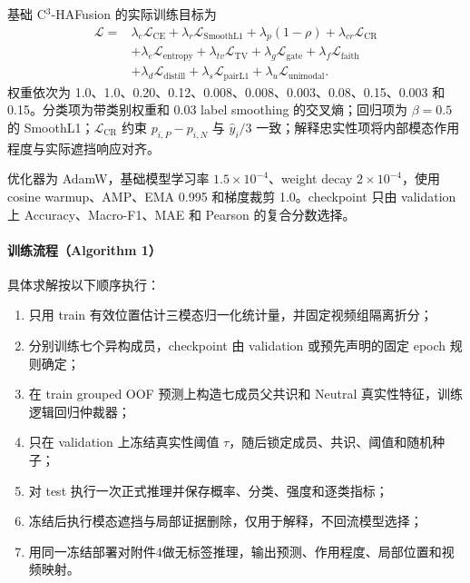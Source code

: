 基础 C$^3$-HAFusion 的实际训练目标为
\begin{equation}
\begin{aligned}
\mathcal L={}&\lambda_c\mathcal L_{\mathrm{CE}}+
\lambda_r\mathcal L_{\mathrm{SmoothL1}}+
\lambda_p(1-\rho)+\lambda_{cr}\mathcal L_{\mathrm{CR}}\\
&+\lambda_e\mathcal L_{\mathrm{entropy}}+
\lambda_{tv}\mathcal L_{\mathrm{TV}}+
\lambda_g\mathcal L_{\mathrm{gate}}+
\lambda_f\mathcal L_{\mathrm{faith}}\\
&+\lambda_d\mathcal L_{\mathrm{distill}}+
\lambda_s\mathcal L_{\mathrm{pairL1}}+
\lambda_u\mathcal L_{\mathrm{unimodal}}.
\end{aligned}
\label{eq:q3_loss}
\end{equation}
权重依次为 1.0、1.0、0.20、0.12、0.008、0.008、0.003、0.08、0.15、0.003 和 0.15。分类项为带类别权重和 0.03 label smoothing 的交叉熵；回归项为 \(\beta=0.5\) 的 SmoothL1；\(\mathcal L_{\mathrm{CR}}\) 约束 \(p_{i,P}-p_{i,N}\) 与 \(\hat y_i/3\) 一致；解释忠实性项将内部模态作用程度与实际遮挡响应对齐。

优化器为 AdamW，基础模型学习率 \(1.5\times10^{-4}\)、weight decay \(2\times10^{-4}\)，使用 cosine warmup、AMP、EMA 0.995 和梯度裁剪 1.0。checkpoint 只由 validation 上 Accuracy、Macro-F1、MAE 和 Pearson 的复合分数选择。



\paragraph{训练流程（Algorithm 1）}
具体求解按以下顺序执行：
\begin{enumerate}
  \item 只用 train 有效位置估计三模态归一化统计量，并固定视频组隔离折分；
  \item 分别训练七个异构成员，checkpoint 由 validation 或预先声明的固定 epoch 规则确定；
  \item 在 train grouped OOF 预测上构造七成员父共识和 Neutral 真实性特征，训练逻辑回归仲裁器；
  \item 只在 validation 上冻结真实性阈值 \(\tau\)，随后锁定成员、共识、阈值和随机种子；
  \item 对 test 执行一次正式推理并保存概率、分类、强度和逐类指标；
  \item 冻结后执行模态遮挡与局部证据删除，仅用于解释，不回流模型选择；
  \item 用同一冻结部署对附件4做无标签推理，输出预测、作用程度、局部位置和视频映射。
\end{enumerate}

